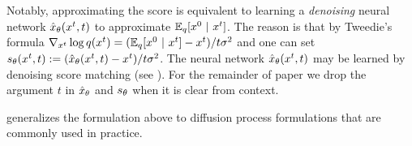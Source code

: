 Notably, approximating the score is equivalent to learning a \emph{denoising} neural network ${\hat x}_\theta (x^{t}, t)$ to approximate $\mathbb{E}_q[x^{0} ~\vert~ x^{t}]$. 
The reason is that by Tweedie's formula \citep{efron2011tweedie,robbins1992empirical} $\nabla_{x^{t}}\log q(x^{t}) = (\mathbb{E}_q[x^{0} ~\vert~ x^{t}] - x^{t})/t\sigma^2$ 
and one can set $s_\theta(x^{t},t):=  ({\hat x}_\theta (x^{t},t)- x^{t})/t\sigma^2$. 
The neural network ${\hat x}_\theta (x^{t},t)$ may be learned by denoising score matching (see \citep[e.g.][]{ho2020denoising,vincent2011connection}). 
For the remainder of paper we drop the argument $t$ in ${\hat x}_\theta$ and  $s_\theta$ when it is clear from context. 

 generalizes the formulation above to diffusion process formulations that are commonly used in practice.



